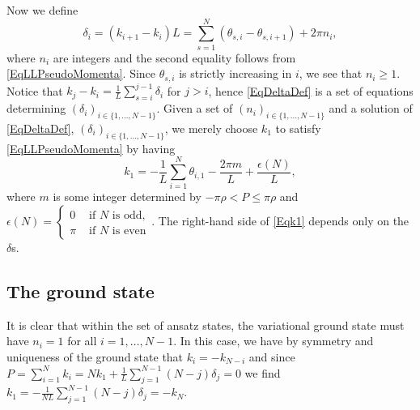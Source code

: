 Now we define \begin{equation}\label{EqDeltaDef}
\delta_i=(k_{i+1}-k_i)L=\sum_{s=1}^{N}(\theta_{s,i}-\theta_{s,i+1})+2\pi n_i,
\end{equation} where $ n_i $ are integers and the second equality follows from \eqref{EqLLPseudoMomenta}. Since $ \theta_{s,i} $ is strictly increasing in $ i $, we see that $ n_i\geq 1 $. Notice that $ k_j-k_i=\frac{1}{L}\sum_{s=i}^{j-1}\delta_i $ for $ j>i $, hence \eqref{EqDeltaDef} is a set of equations determining $ (\delta_i)_{i\in\{1,\ldots,N-1\}} $. Given a set of $ (n_i)_{i\in\{1,\ldots,N-1\}} $ and a solution of \eqref{EqDeltaDef}, $ (\delta_i)_{i\in\{1,\ldots,N-1\}} $, we merely choose $ k_1 $ to satisfy \eqref{EqLLPseudoMomenta} by having \begin{equation}\label{Eqk1}
	k_1=-\frac{1}{L}\sum_{i=1}^{N}\theta_{i,1}-\frac{2\pi m}{L}+\frac{\epsilon(N)}{L},
	\end{equation}
	where $ m $ is some integer determined by $ -\pi\rho <P\leq \pi\rho $ and\\ $ \epsilon(N)=\begin{cases}
	0&\text{ if } N\text{ is odd},\\
	\pi&\text{ if } N\text{ is even}
	\end{cases} $. The right-hand side of \eqref{Eqk1} depends only on the $ \delta $s.\\
	\subsection{The ground state}
	It is clear that within the set of ansatz states, the variational ground state must have $ n_i=1 $ for all $ i=1,\ldots, N-1 $. In this case, we have by symmetry and uniqueness of the ground state that $ k_i=-k_{N-i} $ and since $ P=\sum_{i=1}^{N}k_i=Nk_1+\frac{1}{L}\sum_{j=1}^{N-1}(N-j)\delta_j=0 $ we find $ k_1=-\frac{1}{NL}\sum_{j=1}^{N-1}(N-j)\delta_j=-k_N$.\\
	
